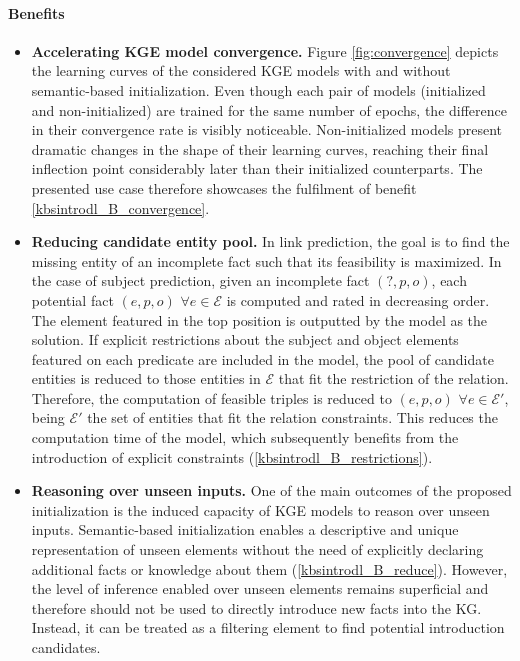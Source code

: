 \paragraph{Benefits}
\begin{itemize}
    \item \textbf{Accelerating KGE model convergence.} Figure \ref{fig:convergence} depicts the learning curves of the considered KGE models with and without semantic-based initialization. Even though each pair of models (initialized and non-initialized) are trained for the same number of epochs, the difference in their convergence rate is visibly noticeable. Non-initialized models present dramatic changes in the shape of their learning curves, reaching their final inflection point considerably later than their initialized counterparts. The presented use case therefore showcases the fulfilment of benefit \ref{kbsintrodl_B_convergence}.
    
    \item \textbf{Reducing candidate entity pool.} In link prediction, the goal is to find the missing entity of an incomplete fact such that its feasibility is maximized. In the case of subject prediction, given an incomplete fact $(?,p,o)$, each potential fact $(e,p,o)$ $\forall e \in \mathcal{E}$ is computed and rated in decreasing order. The element featured in the top position is outputted by the model as the solution. If explicit restrictions about the subject and object elements featured on each predicate are included in the model, the pool of candidate entities is reduced to those entities in $\mathcal{E}$ that fit the restriction of the relation. Therefore, the computation of feasible triples is reduced to $(e,p,o)$ $\forall e \in \mathcal{E}'$, being $\mathcal{E}'$ the set of entities that fit the relation constraints. This reduces the computation time of the model, which subsequently benefits from the introduction of explicit constraints (\ref{kbsintrodl_B_restrictions}).
    
    \item \textbf{Reasoning over unseen inputs.} One of the main outcomes of the proposed initialization is the induced capacity of KGE models to reason over unseen inputs. Semantic-based initialization enables a descriptive and unique representation of unseen elements without the need of explicitly declaring additional facts or knowledge about them (\ref{kbsintrodl_B_reduce}). However, the level of inference enabled over unseen elements remains superficial and therefore should not be used to directly introduce new facts into the KG. Instead, it can be treated as a filtering element to find potential introduction candidates.
\end{itemize}


